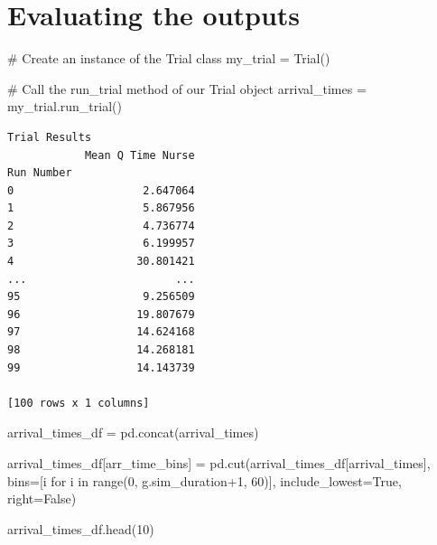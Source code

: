 \documentclass[
  letterpaper,
  DIV=11,
  numbers=noendperiod]{scrreprt}
\newenvironment{Shaded}{\begin{snugshade}}{\end{snugshade}}
\newcommand{\BuiltInTok}[1]{\textcolor[rgb]{0.00,0.23,0.31}{#1}}
\newcommand{\CommentTok}[1]{\textcolor[rgb]{0.37,0.37,0.37}{#1}}
\newcommand{\ControlFlowTok}[1]{\textcolor[rgb]{0.00,0.23,0.31}{#1}}
\newcommand{\DecValTok}[1]{\textcolor[rgb]{0.68,0.00,0.00}{#1}}
\newcommand{\KeywordTok}[1]{\textcolor[rgb]{0.00,0.23,0.31}{#1}}
\newcommand{\NormalTok}[1]{\textcolor[rgb]{0.00,0.23,0.31}{#1}}
\newcommand{\OperatorTok}[1]{\textcolor[rgb]{0.37,0.37,0.37}{#1}}
\newcommand{\StringTok}[1]{\textcolor[rgb]{0.13,0.47,0.30}{#1}}
\newcommand{\VariableTok}[1]{\textcolor[rgb]{0.07,0.07,0.07}{#1}}
\begin{document}
\section{Evaluating the outputs}\label{evaluating-the-outputs-5}

\begin{Shaded}
\begin{Highlighting}[]
\CommentTok{\# Create an instance of the Trial class}
\NormalTok{my\_trial }\OperatorTok{=}\NormalTok{ Trial()}

\CommentTok{\# Call the run\_trial method of our Trial object}
\NormalTok{arrival\_times }\OperatorTok{=}\NormalTok{ my\_trial.run\_trial()}
\end{Highlighting}
\end{Shaded}

\begin{verbatim}
Trial Results
            Mean Q Time Nurse
Run Number                   
0                    2.647064
1                    5.867956
2                    4.736774
3                    6.199957
4                   30.801421
...                       ...
95                   9.256509
96                  19.807679
97                  14.624168
98                  14.268181
99                  14.143739

[100 rows x 1 columns]
\end{verbatim}

\begin{Shaded}
\begin{Highlighting}[]
\NormalTok{arrival\_times\_df }\OperatorTok{=}\NormalTok{ pd.concat(arrival\_times)}

\NormalTok{arrival\_times\_df[}\StringTok{\textquotesingle{}arr\_time\_bins\textquotesingle{}}\NormalTok{] }\OperatorTok{=}\NormalTok{ pd.cut(arrival\_times\_df[}\StringTok{\textquotesingle{}arrival\_times\textquotesingle{}}\NormalTok{], bins}\OperatorTok{=}\NormalTok{[i }\ControlFlowTok{for}\NormalTok{ i }\KeywordTok{in} \BuiltInTok{range}\NormalTok{(}\DecValTok{0}\NormalTok{, g.sim\_duration}\OperatorTok{+}\DecValTok{1}\NormalTok{, }\DecValTok{60}\NormalTok{)], include\_lowest}\OperatorTok{=}\VariableTok{True}\NormalTok{, right}\OperatorTok{=}\VariableTok{False}\NormalTok{)}

\NormalTok{arrival\_times\_df.head(}\DecValTok{10}\NormalTok{)}
\end{Highlighting}
\end{Shaded}
\end{document}
